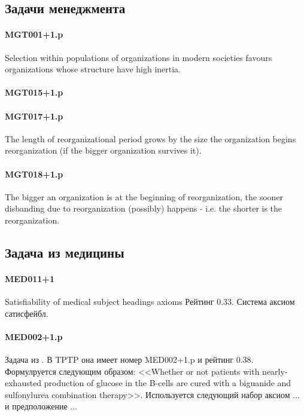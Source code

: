 \subsection{Задачи менеджмента}

\paragraph{MGT001+1.p}
Selection within populations of organizations in modern societies favours organizations whose structure have high inertia.

\paragraph{MGT015+1.p}

\paragraph{MGT017+1.p}
 The length of reorganizational period grows by the size the organization begins reorganization (if the bigger organization survives it).

\paragraph{MGT018+1.p}
The bigger an organization is at the beginning of reorganization, the sooner disbanding due to reorganization (possibly) happens - i.e. the shorter is the reorganization.


\subsection{Задача из медицины}
\paragraph{MED011+1}
Satisfiability of medical subject headings axioms
Рейтинг 0.33. Система аксиом сатисфейбл.


\paragraph{MED002+1.p}
Задача из \cite{med1}. В TPTP она имеет номер MED002+1.p и рейтинг 0.38.
Формулруется следующим образом: <<Whether or not patients with nearly-exhausted production of glucose in the B-cells are cured with a biguanide and sulfonylurea combination therapy>>. Используется следующий набор аксиом ... и предположение ...

